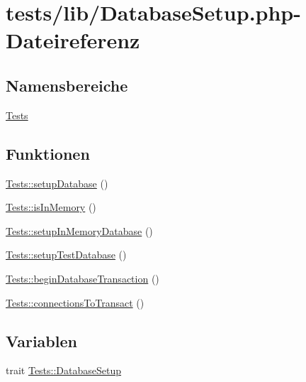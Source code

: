 \hypertarget{DatabaseSetup_8php}{}\section{tests/lib/\+Database\+Setup.php-\/\+Dateireferenz}
\label{DatabaseSetup_8php}
\subsection*{Namensbereiche}
\begin{DoxyCompactItemize}
\item 
 \hyperlink{namespaceTests}{Tests}
\end{DoxyCompactItemize}
\subsection*{Funktionen}
\begin{DoxyCompactItemize}
\item 
\hyperlink{namespaceTests_a8f03c9e1722fde365bab9ff9c0109f1e}{Tests\+::setup\+Database} ()
\item 
\hyperlink{namespaceTests_a6d14bd4b535e21847e4506fbcba3e4d5}{Tests\+::is\+In\+Memory} ()
\item 
\hyperlink{namespaceTests_a2272eb6a027bdc19e7c8d22cd7c9c103}{Tests\+::setup\+In\+Memory\+Database} ()
\item 
\hyperlink{namespaceTests_a71b2492d450b5daf3a28394bacf9b748}{Tests\+::setup\+Test\+Database} ()
\item 
\hyperlink{namespaceTests_aeae90ed4a61f6fdbfb44b913099c2773}{Tests\+::begin\+Database\+Transaction} ()
\item 
\hyperlink{namespaceTests_a3f50d9094b746f372c784950c0eaf1a0}{Tests\+::connections\+To\+Transact} ()
\end{DoxyCompactItemize}
\subsection*{Variablen}
\begin{DoxyCompactItemize}
\item 
trait \hyperlink{namespaceTests_a61a1f8e81d061aa7cd42fb96f6c98929}{Tests\+::\+Database\+Setup}
\end{DoxyCompactItemize}
